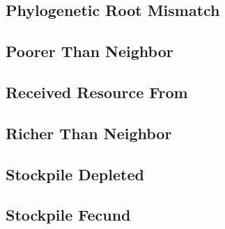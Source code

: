 \subsection{Phylogenetic Root Mismatch}

\subsection{Poorer Than Neighbor}

\subsection{Received Resource From}

\subsection{Richer Than Neighbor}

\subsection{Stockpile Depleted}

\subsection{Stockpile Fecund}
